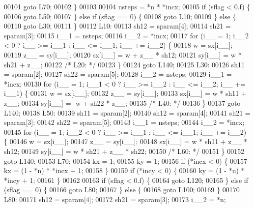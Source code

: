 \begin{DoxyCode}
00101     \textcolor{keywordflow}{goto} L70;
00102     \}
00103 
00104     nsteps = *n * *incx;
00105     \textcolor{keywordflow}{if} (sflag < 0.f) \{
00106     \textcolor{keywordflow}{goto} L50;
00107     \} \textcolor{keywordflow}{else} \textcolor{keywordflow}{if} (sflag == 0) \{
00108     \textcolor{keywordflow}{goto} L10;
00109     \} \textcolor{keywordflow}{else} \{
00110     \textcolor{keywordflow}{goto} L30;
00111     \}
00112 L10:
00113     sh12 = sparam[4];
00114     sh21 = sparam[3];
00115     i\_\_1 = nsteps;
00116     i\_\_2 = *incx;
00117     \textcolor{keywordflow}{for} (i\_\_ = 1; i\_\_2 < 0 ? i\_\_ >= i\_\_1 : i\_\_ <= i\_\_1; i\_\_ += i\_\_2) \{
00118     w = sx[i\_\_];
00119     z\_\_ = sy[i\_\_];
00120     sx[i\_\_] = w + z\_\_ * sh12;
00121     sy[i\_\_] = w * sh21 + z\_\_;
00122 \textcolor{comment}{/* L20: */}
00123     \}
00124     \textcolor{keywordflow}{goto} L140;
00125 L30:
00126     sh11 = sparam[2];
00127     sh22 = sparam[5];
00128     i\_\_2 = nsteps;
00129     i\_\_1 = *incx;
00130     \textcolor{keywordflow}{for} (i\_\_ = 1; i\_\_1 < 0 ? i\_\_ >= i\_\_2 : i\_\_ <= i\_\_2; i\_\_ += i\_\_1) \{
00131     w = sx[i\_\_];
00132     z\_\_ = sy[i\_\_];
00133     sx[i\_\_] = w * sh11 + z\_\_;
00134     sy[i\_\_] = -w + sh22 * z\_\_;
00135 \textcolor{comment}{/* L40: */}
00136     \}
00137     \textcolor{keywordflow}{goto} L140;
00138 L50:
00139     sh11 = sparam[2];
00140     sh12 = sparam[4];
00141     sh21 = sparam[3];
00142     sh22 = sparam[5];
00143     i\_\_1 = nsteps;
00144     i\_\_2 = *incx;
00145     \textcolor{keywordflow}{for} (i\_\_ = 1; i\_\_2 < 0 ? i\_\_ >= i\_\_1 : i\_\_ <= i\_\_1; i\_\_ += i\_\_2) \{
00146     w = sx[i\_\_];
00147     z\_\_ = sy[i\_\_];
00148     sx[i\_\_] = w * sh11 + z\_\_ * sh12;
00149     sy[i\_\_] = w * sh21 + z\_\_ * sh22;
00150 \textcolor{comment}{/* L60: */}
00151     \}
00152     \textcolor{keywordflow}{goto} L140;
00153 L70:
00154     kx = 1;
00155     ky = 1;
00156     \textcolor{keywordflow}{if} (*incx < 0) \{
00157     kx = (1 - *n) * *incx + 1;
00158     \}
00159     \textcolor{keywordflow}{if} (*incy < 0) \{
00160     ky = (1 - *n) * *incy + 1;
00161     \}
00162 
00163     \textcolor{keywordflow}{if} (sflag < 0.f) \{
00164     \textcolor{keywordflow}{goto} L120;
00165     \} \textcolor{keywordflow}{else} \textcolor{keywordflow}{if} (sflag == 0) \{
00166     \textcolor{keywordflow}{goto} L80;
00167     \} \textcolor{keywordflow}{else} \{
00168     \textcolor{keywordflow}{goto} L100;
00169     \}
00170 L80:
00171     sh12 = sparam[4];
00172     sh21 = sparam[3];
00173     i\_\_2 = *n;

\end{DoxyCode}
